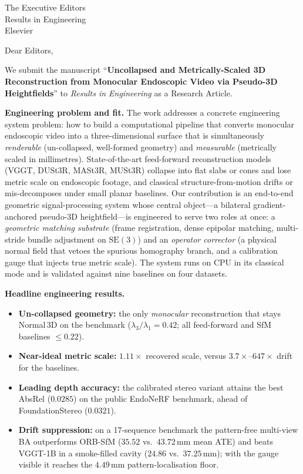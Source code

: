\documentclass[12pt]{letter}
\begin{document}
\begin{letter}{The Executive Editors\\
Results in Engineering\\
Elsevier}

\opening{Dear Editors,}

We submit the manuscript
``\textbf{Uncollapsed and Metrically-Scaled 3D Reconstruction from Monocular Endoscopic Video via Pseudo-3D Heightfields}''
to \textit{Results in Engineering} as a Research Article.

\textbf{Engineering problem and fit.}
The work addresses a concrete engineering system problem: how to build a computational pipeline that converts monocular endoscopic video into a three-dimensional surface that is simultaneously \emph{renderable} (un-collapsed, well-formed geometry) and \emph{measurable} (metrically scaled in millimetres). State-of-the-art feed-forward reconstruction models (VGGT, DUSt3R, MASt3R, MUSt3R) collapse into flat slabs or cones and lose metric scale on endoscopic footage, and classical structure-from-motion drifts or mis-decomposes under small planar baselines. Our contribution is an end-to-end geometric signal-processing system whose central object---a bilateral gradient-anchored pseudo-3D heightfield---is engineered to serve two roles at once: a \emph{geometric matching substrate} (frame registration, dense epipolar matching, multi-stride bundle adjustment on $\mathrm{SE}(3)$) and an \emph{operator corrector} (a physical normal field that vetoes the spurious homography branch, and a calibration gauge that injects true metric scale). The system runs on CPU in its classical mode and is validated against nine baselines on four datasets.

\textbf{Headline engineering results.}
\begin{itemize}
    \item \textbf{Un-collapsed geometry:} the only \emph{monocular} reconstruction that stays Normal\,3D on the benchmark ($\lambda_3/\lambda_1 = 0.42$; all feed-forward and SfM baselines $\leq 0.22$).
    \item \textbf{Near-ideal metric scale:} $1.11\times$ recovered scale, versus $3.7\times$--$647\times$ drift for the baselines.
    \item \textbf{Leading depth accuracy:} the calibrated stereo variant attains the best AbsRel ($0.0285$) on the public EndoNeRF benchmark, ahead of FoundationStereo ($0.0321$).
    \item \textbf{Drift suppression:} on a 17-sequence benchmark the pattern-free multi-view BA outperforms ORB-SfM ($35.52$ vs.\ $43.72$\,mm mean ATE) and beats VGGT-1B in a smoke-filled cavity ($24.86$ vs.\ $37.25$\,mm); with the gauge visible it reaches the $4.49$\,mm pattern-localisation floor.
\end{itemize}


\end{letter}
\end{document}

